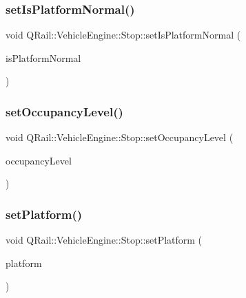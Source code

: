 \subsubsection{\texorpdfstring{setIsPlatformNormal()}{setIsPlatformNormal()}}
{\footnotesize\ttfamily void Q\+Rail\+::\+Vehicle\+Engine\+::\+Stop\+::set\+Is\+Platform\+Normal (\begin{DoxyParamCaption}\item[{const bool \&}]{is\+Platform\+Normal }\end{DoxyParamCaption})}

\mbox{\label{classQRail_1_1VehicleEngine_1_1Stop_aaf19045fbbb3acf711deff03f86d9042}} 
\subsubsection{\texorpdfstring{setOccupancyLevel()}{setOccupancyLevel()}}
{\footnotesize\ttfamily void Q\+Rail\+::\+Vehicle\+Engine\+::\+Stop\+::set\+Occupancy\+Level (\begin{DoxyParamCaption}\item[{const \mbox{\hyperlink{classQRail_1_1VehicleEngine_1_1Stop_ad967ed81b19762bd582c1af07354a6d4}{Q\+Rail\+::\+Vehicle\+Engine\+::\+Stop\+::\+Occupancy\+Level}} \&}]{occupancy\+Level }\end{DoxyParamCaption})}

\mbox{\label{classQRail_1_1VehicleEngine_1_1Stop_a317e658aed106459047de9aa3d0ed46c}} 
\subsubsection{\texorpdfstring{setPlatform()}{setPlatform()}}
{\footnotesize\ttfamily void Q\+Rail\+::\+Vehicle\+Engine\+::\+Stop\+::set\+Platform (\begin{DoxyParamCaption}\item[{const Q\+String \&}]{platform }\end{DoxyParamCaption})}

\mbox{\label{classQRail_1_1VehicleEngine_1_1Stop_ac7c7af1d3b4b77228eddabe566900633}} 
